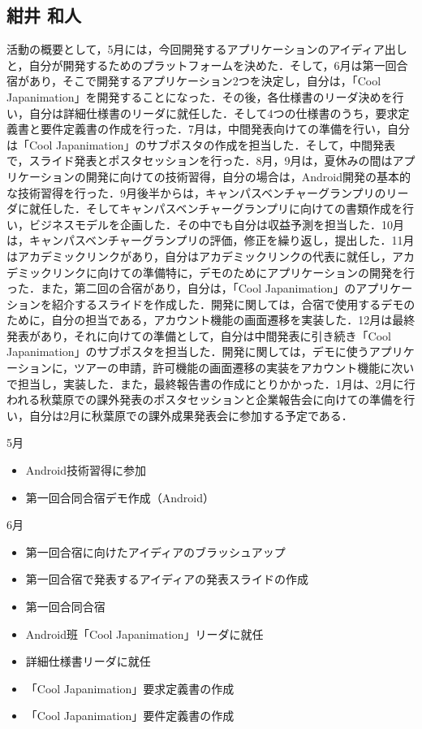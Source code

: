 \subsection{紺井 和人}
\par
活動の概要として，5月には，今回開発するアプリケーションのアイディア出しと，自分が開発するためのプラットフォームを決めた．そして，6月は第一回合宿があり，そこで開発するアプリケーション2つを決定し，自分は，「Cool Japanimation」を開発することになった．その後，各仕様書のリーダ決めを行い，自分は詳細仕様書のリーダに就任した．そして4つの仕様書のうち，要求定義書と要件定義書の作成を行った．7月は，中間発表向けての準備を行い，自分は「Cool Japanimation」のサブポスタの作成を担当した．そして，中間発表で，スライド発表とポスタセッションを行った．8月，9月は，夏休みの間はアプリケーションの開発に向けての技術習得，自分の場合は，Android開発の基本的な技術習得を行った．9月後半からは，キャンパスベンチャーグランプリのリーダに就任した．そしてキャンパスベンチャーグランプリに向けての書類作成を行い，ビジネスモデルを企画した．その中でも自分は収益予測を担当した．10月は，キャンパスベンチャーグランプリの評価，修正を繰り返し，提出した．11月はアカデミックリンクがあり，自分はアカデミックリンクの代表に就任し，アカデミックリンクに向けての準備特に，デモのためにアプリケーションの開発を行った．また，第二回の合宿があり，自分は，「Cool Japanimation」のアプリケーションを紹介するスライドを作成した．開発に関しては，合宿で使用するデモのために，自分の担当である，アカウント機能の画面遷移を実装した．12月は最終発表があり，それに向けての準備として，自分は中間発表に引き続き「Cool Japanimation」のサブポスタを担当した．開発に関しては，デモに使うアプリケーションに，ツアーの申請，許可機能の画面遷移の実装をアカウント機能に次いで担当し，実装した．また，最終報告書の作成にとりかかった．1月は、2月に行われる秋葉原での課外発表のポスタセッションと企業報告会に向けての準備を行い，自分は2月に秋葉原での課外成果発表会に参加する予定である．
\par
5月
\begin{itemize}
\item Android技術習得に参加
\item 第一回合同合宿デモ作成（Android）
\end{itemize}
6月
\begin{itemize}
\item 第一回合宿に向けたアイディアのブラッシュアップ
\item 第一回合宿で発表するアイディアの発表スライドの作成
\item 第一回合同合宿
\item Android班「Cool Japanimation」リーダに就任
\item 詳細仕様書リーダに就任
\item 「Cool Japanimation」要求定義書の作成
\item 「Cool Japanimation」要件定義書の作成
\end{itemize}
